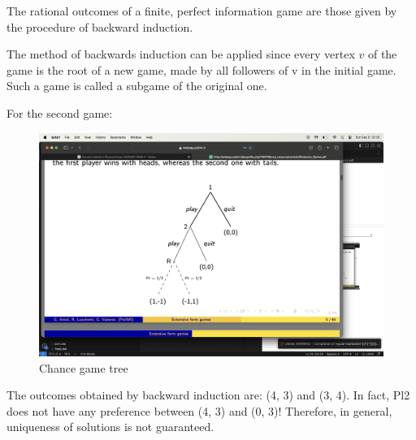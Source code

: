 \begin{theorem}
    The rational outcomes of a finite, perfect information game are those given by the procedure of backward induction.
\end{theorem}
The method of backwards induction can be applied since every vertex $v$ of the game is the root of a new game, made by all followers of v in the initial game.
Such a game is called a subgame of the original one.
\begin{example}
    For the second game: 
    \begin{figure}[H]
        \centering
        \includegraphics[width=0.75\linewidth]{images/tree1.png}
        \caption{Chance game tree}
    \end{figure}
    The outcomes obtained by backward induction are: (4, 3) and (3, 4). In fact, Pl2 does not have any preference between (4, 3) and (0, 3)!
    Therefore, in general, uniqueness of solutions is not guaranteed. 
\end{example}
